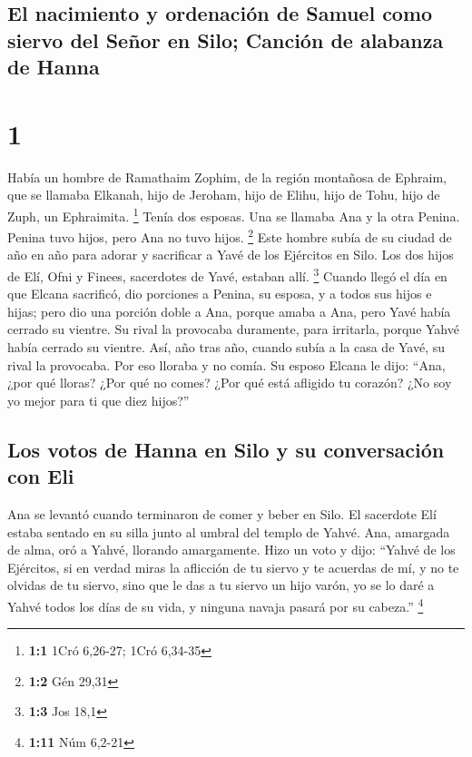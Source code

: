 \hypertarget{el-nacimiento-y-ordenaciuxf3n-de-samuel-como-siervo-del-seuxf1or-en-silo-canciuxf3n-de-alabanza-de-hanna}{%
\subsection{El nacimiento y ordenación de Samuel como siervo del Señor
en Silo; Canción de alabanza de
Hanna}\label{el-nacimiento-y-ordenaciuxf3n-de-samuel-como-siervo-del-seuxf1or-en-silo-canciuxf3n-de-alabanza-de-hanna}}

\hypertarget{section}{%
\section{1}\label{section}}

 Había un hombre de Ramathaim Zophim, de la región
montañosa de Ephraim, que se llamaba Elkanah, hijo de Jeroham, hijo de
Elihu, hijo de Tohu, hijo de Zuph, un Ephraimita. \footnote{\textbf{1:1}
  1Cró 6,26-27; 1Cró 6,34-35}  Tenía dos esposas. Una se
llamaba Ana y la otra Penina. Penina tuvo hijos, pero Ana no tuvo hijos.
\footnote{\textbf{1:2} Gén 29,31}  Este hombre subía de su
ciudad de año en año para adorar y sacrificar a Yavé de los Ejércitos en
Silo. Los dos hijos de Elí, Ofni y Finees, sacerdotes de Yavé, estaban
allí. \footnote{\textbf{1:3} Jos 18,1}  Cuando llegó el
día en que Elcana sacrificó, dio porciones a Penina, su esposa, y a
todos sus hijos e hijas;  pero dio una porción doble a
Ana, porque amaba a Ana, pero Yavé había cerrado su vientre.
 Su rival la provocaba duramente, para irritarla, porque
Yahvé había cerrado su vientre.  Así, año tras año, cuando
subía a la casa de Yavé, su rival la provocaba. Por eso lloraba y no
comía.  Su esposo Elcana le dijo: ``Ana, ¿por qué lloras?
¿Por qué no comes? ¿Por qué está afligido tu corazón? ¿No soy yo mejor
para ti que diez hijos?''

\hypertarget{los-votos-de-hanna-en-silo-y-su-conversaciuxf3n-con-eli}{%
\subsection{Los votos de Hanna en Silo y su conversación con
Eli}\label{los-votos-de-hanna-en-silo-y-su-conversaciuxf3n-con-eli}}

 Ana se levantó cuando terminaron de comer y beber en
Silo. El sacerdote Elí estaba sentado en su silla junto al umbral del
templo de Yahvé.  Ana, amargada de alma, oró a Yahvé,
llorando amargamente.  Hizo un voto y dijo: ``Yahvé de
los Ejércitos, si en verdad miras la aflicción de tu siervo y te
acuerdas de mí, y no te olvidas de tu siervo, sino que le das a tu
siervo un hijo varón, yo se lo daré a Yahvé todos los días de su vida, y
ninguna navaja pasará por su cabeza.'' \footnote{\textbf{1:11} Núm
  6,2-21}

